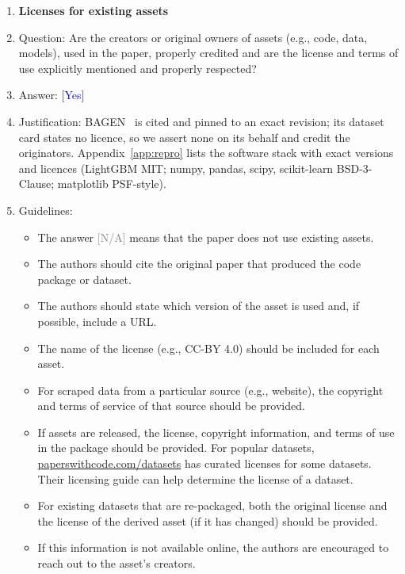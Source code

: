 \documentclass{article}
\providecommand{\answerYes}[1][]{\textcolor{blue}{[Yes] #1}}
\providecommand{\answerNA}[1][]{\textcolor{gray}{[N/A] #1}}
\begin{document}
\begin{enumerate}
\item {\bf Licenses for existing assets}
    \item[] Question: Are the creators or original owners of assets (e.g., code, data, models), used in the paper, properly credited and are the license and terms of use explicitly mentioned and properly respected?
    \item[] Answer: \answerYes{}
    \item[] Justification: BAGEN~\citep{lin2026bagen} is cited and pinned to an exact revision; its dataset card states no licence, so we assert none on its behalf and credit the originators. Appendix~\ref{app:repro} lists the software stack with exact versions and licences (LightGBM MIT; numpy, pandas, scipy, scikit-learn BSD-3-Clause; matplotlib PSF-style).
    \item[] Guidelines:
    \begin{itemize}
        \item The answer \answerNA{} means that the paper does not use existing assets.
        \item The authors should cite the original paper that produced the code package or dataset.
        \item The authors should state which version of the asset is used and, if possible, include a URL.
        \item The name of the license (e.g., CC-BY 4.0) should be included for each asset.
        \item For scraped data from a particular source (e.g., website), the copyright and terms of service of that source should be provided.
        \item If assets are released, the license, copyright information, and terms of use in the package should be provided. For popular datasets, \url{paperswithcode.com/datasets} has curated licenses for some datasets. Their licensing guide can help determine the license of a dataset.
        \item For existing datasets that are re-packaged, both the original license and the license of the derived asset (if it has changed) should be provided.
        \item If this information is not available online, the authors are encouraged to reach out to the asset's creators.
    \end{itemize}


\end{enumerate}
\end{document}
